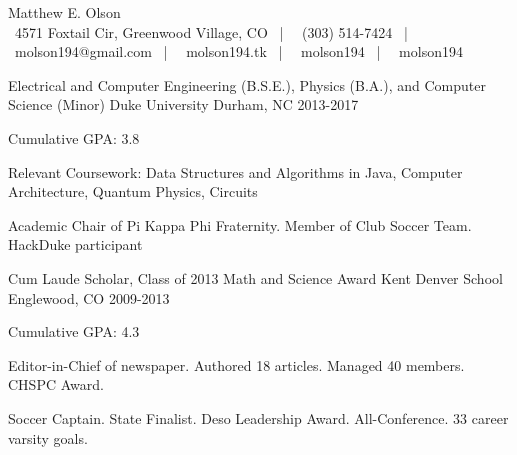 \documentclass[11pt, a4paper]{resume}
\begin{document}
	\begin{center}
    	{\fontsize{26pt}{1em}\headerfontlight\color{gray} Matthew E. Olson}
        \vspace{1mm}
    	\\
    	{\fontsize{6.8pt}{1em}\headerfont\color{darkgray}
    		{\faHome\ 4571 Foxtail Cir, Greenwood Village, CO} \, | \,
    		{\faMobile\ (303) 514-7424} \, | \,
    		{\faEnvelope\ molson194@gmail.com} \, | \,
    		{\faUser\ molson194.tk} \, | \,
    		{\faGithubSquare\ molson194} \, | \,
    		{\faLinkedinSquare\ molson194}
    	}
    \end{center}
    \par\addvspace{1.5ex}
    
    \fancyfoot[L]{\footerstyle{\today}}
  	\fancyfoot[R]{\footerstyle{\thepage}} 

\begin{cventries}
  \cventry
    {Electrical and Computer Engineering (B.S.E.), Physics (B.A.), and Computer Science (Minor)}
    {Duke University}
    {Durham, NC}
    {2013-2017}
    {
      \begin{cvitems}
        \item {Cumulative GPA: 3.8}
        \item {Relevant Coursework: Data Structures and Algorithms in Java, Computer Architecture, Quantum Physics, Circuits}
        \item{Academic Chair of Pi Kappa Phi Fraternity. Member of Club Soccer Team. HackDuke participant}
      \end{cvitems}
    }
  \cventry
  	{Cum Laude Scholar, Class of 2013 Math and Science Award}
    {Kent Denver School}
    {Englewood, CO}
    {2009-2013}
    {
    	\begin{cvitems}
        	\item {Cumulative GPA: 4.3}
            \item {Editor-in-Chief of newspaper. Authored 18 articles. Managed 40 members. CHSPC Award.}
            \item {Soccer Captain. State Finalist. Deso Leadership Award. All-Conference. 33 career varsity goals.}
        \end{cvitems}
    }
\end{cventries}
\end{document}
